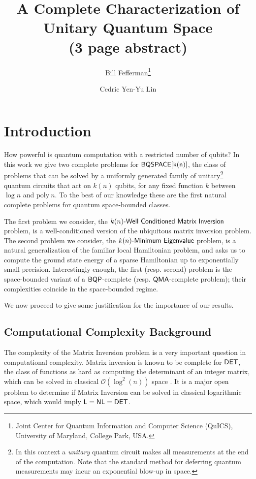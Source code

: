 \documentclass[11pt]{article}
\title{A Complete Characterization of Unitary Quantum Space \\ {\small \bf (3 page abstract)}}
\author{Bill Fefferman\thanks{Joint Center for Quantum Information and Computer Science (QuICS), University of Maryland,
College Park, USA.}
\and {Cedric Yen-Yu Lin\samethanks}}
\date{}
\numberwithin{lemma}{section}
\theoremstyle{definition}
\newcommand\BQP{\sf{BQP}}
\newcommand\BQSPACE{\sf{BQSPACE}}
\newcommand\DET{{\sf{DET}}}
\newcommand\Logspace{{\sf{L}}}
\newcommand\NL{{\sf{NL}}}
\newcommand\QMA{{\sf{QMA}}}
\newcommand{\polyn}{\mathrm{poly\:}}
\newcommand\spechamiltonian[1]{#1\textit{\sf{-Minimum Eigenvalue}}}
\newcommand\matrixinversion[1]{#1\textit{\sf{-Well Conditioned Matrix Inversion}}}
\begin{document}
\vspace{-2.0in}
\maketitle
\setcounter{page}{0}
\thispagestyle{empty}
\pagestyle{empty}
\vspace{-.6in}
\section{Introduction}
How powerful is quantum computation with a restricted number of qubits? In this work we give two complete problems for $\BQSPACE[k(n)]$, the class of problems that can be solved by a uniformly generated family of unitary\footnote{In this context a {\emph{unitary}} quantum circuit makes all measurements at the end of the computation.  Note that the standard method for deferring quantum measurements may incur an exponential blow-up in space.} quantum circuits that act on $k(n)$ qubits, for any fixed function $k$ between $\log{n}$ and $\polyn{n}$. To the best of our knowledge these are the first natural complete problems for quantum space-bounded classes.

The first problem we consider, the $\matrixinversion{k(n)}$ problem, is a well-conditioned version of the ubiquitous matrix inversion problem. The second problem we consider, the $\spechamiltonian{k(n)}$ problem, is a natural generalization of the familiar local Hamiltonian problem, and asks us to compute the ground state energy of a sparse Hamiltonian up to exponentially small precision. Interestingly enough, the first (resp. second) problem is the space-bounded variant of a $\BQP$-complete (resp. $\QMA$-complete problem); their complexities coincide in the space-bounded regime.

We now proceed to give some justification for the importance of our results.

\subsection{Computational Complexity Background}
The complexity of the Matrix Inversion problem is a very important question in computational complexity. Matrix inversion is known to be complete for $\DET$, the class of functions as hard as computing the determinant of an integer matrix, which can be solved in classical $\mathcal{O}(\log^{2}(n))$ space \cite{berkowitz, cook}. It is a major open problem to determine if Matrix Inversion can be solved in classical logarithmic space, which would imply $\Logspace=\NL=\DET$.
\end{document}
